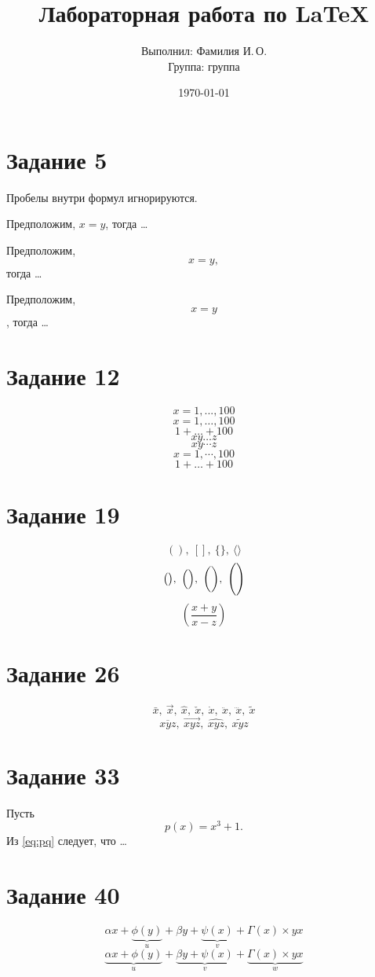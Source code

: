 \documentclass[a4paper,12pt]{article}
\author{
Выполнил: Фамилия И.\,О. \\
Группа: группа
}
\title{Лабораторная работа по \LaTeX}
\date{\today}
\begin{document}
\maketitle

\section*{Задание 5}
Пробелы внутри формул игнорируются.

Предположим, $x=y$, тогда \dots

Предположим, $$x=y,$$ тогда \dots

Предположим, $$x=y$$, тогда \dots

\section*{Задание 12}
\[
 x=1,...,100
\]
\[
 x=1,\dots,100
\]
\[
 1+\dots+100
\]
\[
 xy\dots z
\]
\[
 xy\cdots z
\]
\[
 x=1,\cdots,100
\]
\[
 1+\ldots+100
\]

\section*{Задание 19}
\[
( ),\ [ ],\ \{\},\ \langle\rangle
\]
\[
\bigl(\bigr),\ \Bigl(\Bigr),\ \biggl(\biggr),\ \Biggl(\Biggr)
\]
\[
\left(\frac{x+y}{x-z}\right)
\]

\section*{Задание 26}
\[
\bar x,\ \vec x,\ \hat x,\ \check x,\ \dot x,\ \ddot x,\ \dddot x,\ \tilde x
\]
\[
\overline{xyz},\ \overrightarrow{xyz},\ \widehat{xyz},\ \widetilde{xyz}
\]

\section*{Задание 33}
Пусть
\begin{equation}\label{eq:pq}
 p(x)=x^3+1.
\end{equation}
Из \eqref{eq:pq} следует, что \dots

\section*{Задание 40}
\[
\alpha x + \underbrace{\phi(y)}_{u}
+ \beta y + \underbrace{\psi(x)}_{v}
+ \Gamma(x)\times yx
\]
\[
\underbrace{\alpha x + \phi(y)}_{u}
+ \underbrace{\beta y + \psi(x)}_{v}
+ \underbrace{\Gamma(x)\times yx}_{w}
\]
\end{document}
